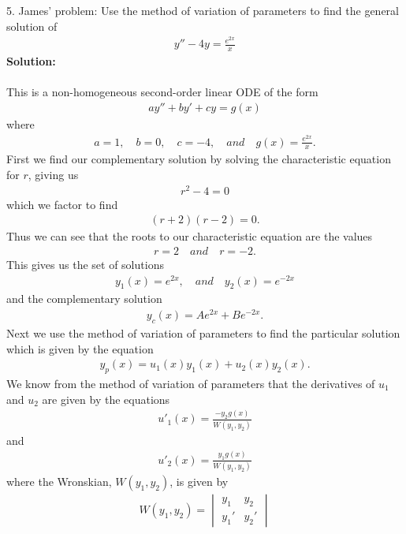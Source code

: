 \documentclass{article}
\begin{document}
\vspace{0.5in}
\hline
\vspace{0.2in}
5. James' problem: Use the method of variation of parameters to find the general solution of
\begin{align*}
y'' - 4y = \frac{e^{2x}}{x}
\end{align*}
\textbf{Solution:}
\\ \\
This is a non-homogeneous second-order linear ODE of the form
\begin{align*}
ay'' + b y'+ cy = g(x)
\end{align*}
where
\begin{align*}
a = 1, \quad b = 0, \quad c = -4, \quad and \quad g(x) = \frac{e^{2x}}{x}.
\end{align*}
First we find our complementary solution by solving the characteristic equation for $r$, giving us
\begin{align*}
r^2-4=0
\end{align*}
which we factor to find
\begin{align*}
(r+2)(r-2)=0.
\end{align*}
Thus we can see that the roots to our characteristic equation are the values
\begin{align*}
r = 2 \quad and \quad r = -2.
\end{align*}
This gives us the set of solutions
\begin{align*}
y_1(x) = e^{2x}, \quad and \quad y_2(x) = e^{-2x}
\end{align*}
and the complementary solution
\begin{align*}
y_c(x) = Ae^{2x}+Be^{-2x}.
\end{align*}
Next we use the method of variation of parameters to find the particular solution which is given by the equation
\begin{align*}
y_p(x) = u_1(x)y_1(x)+u_2(x)y_2(x).
\end{align*}
We know from the method of variation of parameters that the derivatives of $u_1$ and $u_2$ are given by the equations
\begin{align*}
u'_1(x) = \frac{-y_2g(x)}{W(y_1,y_2)} \tag{1}
\end{align*}
and
\begin{align*}
u'_2(x) = \frac{y_1g(x)}{W(y_1,y_2)} \tag{2}
\end{align*}
where the Wronskian, $W(y_1,y_2)$, is given by
\begin{align*}
    W(y_1, y_2) = \begin{vmatrix}
    y_1 & y_2 \\
    y_1' & y_2'
    \end{vmatrix}
\end{align*}
\end{document}
